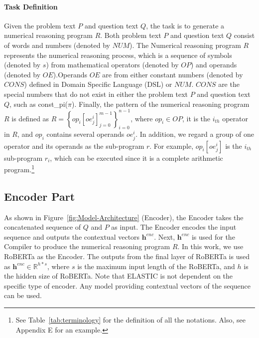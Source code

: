 \documentclass{article}
\begin{document}
\paragraph{Task Definition}
Given the problem text \(P\) and question text \(Q\), the task is to generate a numerical reasoning program \(R\). Both problem text \(P\) and question text \(Q\) consist of words and numbers (denoted by \(\textit{NUM}\)). The Numerical reasoning program \(R\) represents the numerical reasoning process, which is a sequence of symbols (denoted by \(s\)) from mathematical operators (denoted by \(\textit{OP}\)) and operands (denoted by \(\textit{OE}\)).Operands \(\textit{OE}\) are from either constant numbers (denoted by \(\textit{CONS}\)) defined in Domain Specific Language (DSL) or \(\textit{NUM}\). \(\textit{CONS}\) are the special numbers that do not exist in either the problem text \(P\) and question text \(Q\), such as const\_pi(\(\pi\)). Finally, the pattern of the numerical reasoning program \(R\) is defined as \(R =\left\{ op_{i} \left [ oe^{i}_{j} \right ]^{m-1}_{j=0} \right\}^{n-1}_{i=0}\), where \(op_{i} \in \textit{OP}\), it is the  \(i_{th}\) operator in \(R\), and \(op_{i}\) contains several operands \(oe^{i}_{j}\). In addition, we regard a group of one operator and its operands as the sub-program \(r\). For example, \(op_{i} \left[ oe^{i}_{j} \right] \) is the \(i_{th}\) sub-program \(r_{i}\), which can be executed since it is a complete arithmetic program.\footnote{See Table~\ref{tab:terminology} for the definition of all the notations. Also, see Appendix E for an example.}

\subsection{Encoder Part}

As shown in Figure~\ref{fig:Model-Architecture} (Encoder), the Encoder takes the concatenated sequence of \(Q\) and \(P\) as input. The Encoder encodes the input sequence and outputs the contextual vectors \(\textbf{h}^{\textit{enc}}\). Next, \(\textbf{h}^{\textit{enc}}\) is used for the Compiler to produce the numerical reasoning program \(R\). In this work, we use RoBERTa as the Encoder. The outputs from the final layer of RoBERTa is used as \(\textbf{h}^{\textit{enc}} \in \mathbb{R}^{h*s}\), where \(s\) is the maximum input length of the RoBERTa, and \(h\) is the hidden size of RoBERTa. Note that ELASTIC is not dependent on the specific type of encoder. Any model providing contextual vectors of the sequence can be used. 
\end{document}
